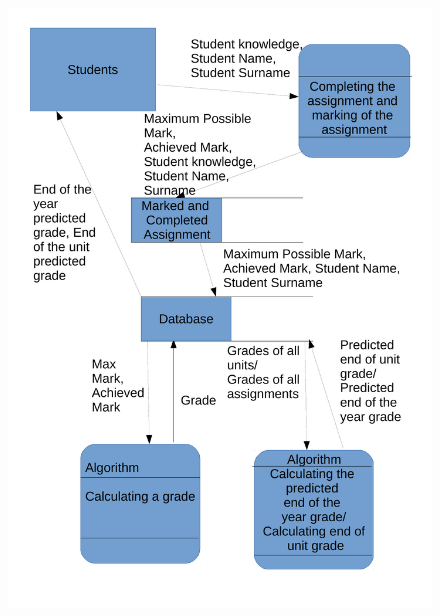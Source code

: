 \begin{figure}[H]
    \includegraphics[width=\textwidth]{./Analysis/images/222DataFlowDiagram.pdf}
\end{figure}

